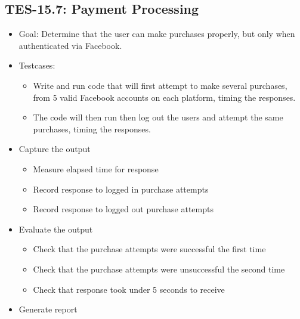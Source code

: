 \subsection{TES-15.7: Payment Processing}
\begin{itemize}
\item Goal: Determine that the user can make purchases properly, but only 
when authenticated via Facebook.
\item Testcases: 
\begin{itemize}
\item Write and run code that will first attempt to make several purchases, 
from 5 valid Facebook accounts on each platform, timing the responses.
\item The code will then run then log out the users and attempt the same 
purchases, timing the responses.
\end{itemize}
\item Capture the output 
\begin{itemize}
\item Measure elapsed time for response
\item Record response to logged in purchase attempts
\item Record response to logged out purchase attempts
\end{itemize}
\item Evaluate the output 
\begin{itemize}
\item Check that the purchase attempts were successful the first time
\item Check that the purchase attempts were unsuccessful the second time
\item Check that response took under 5 seconds to receive
\end{itemize}
\item Generate report 
\end{itemize}

